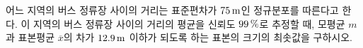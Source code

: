 어느 지역의 버스 정류장 사이의 거리는 표준편차가 $75\mkern3mu \mathrm{m}$인 정규분포를 따른다고 한다. 이 지역의 버스 정류장 사이의 거리의 평균을 신뢰도 $99\mkern3mu \%$로 추정할 때, 모평균 $m$과 표본평균 $\overline{x}$의 차가 $12.9\mkern3mu \mathrm{m}$ 이하가 되도록 하는 표본의 크기의 최솟값을 구하시오. 
